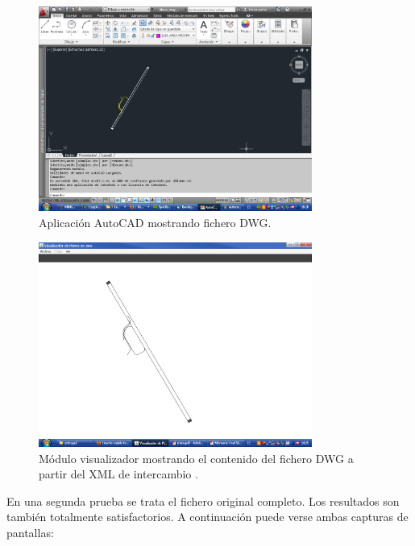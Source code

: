 \begin{figure}[H]
\begin{center}
\includegraphics[width=0.8\textwidth]{imgs/autocad2}
\caption{Aplicación AutoCAD mostrando fichero DWG.}
\end{center}
\end{figure}

\begin{figure}[H]
\begin{center}
\includegraphics[width=0.8\textwidth]{imgs/ejemplo_salida}
\caption{Módulo visualizador mostrando el contenido del fichero DWG a partir del XML de intercambio \cite{Luis-Fernandez-SSII}.}
\end{center}
\end{figure}

En una segunda prueba se trata el fichero original completo. Los resultados son también totalmente satisfactorios. A continuación puede verse ambas capturas de pantallas:

